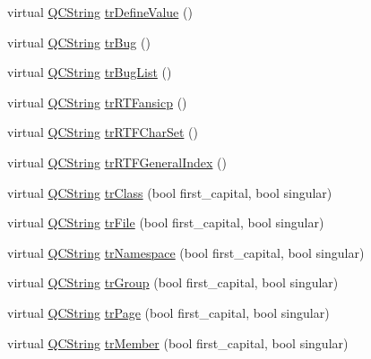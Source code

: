 \begin{DoxyCompactItemize}
\item 
virtual \mbox{\hyperlink{class_q_c_string}{Q\+C\+String}} \mbox{\hyperlink{class_translator_vietnamese_a15d8810651f40d0d83549f27adb640a2}{tr\+Define\+Value}} ()
\item 
virtual \mbox{\hyperlink{class_q_c_string}{Q\+C\+String}} \mbox{\hyperlink{class_translator_vietnamese_a22e633ef89df53443bc0d91eeb6196cb}{tr\+Bug}} ()
\item 
virtual \mbox{\hyperlink{class_q_c_string}{Q\+C\+String}} \mbox{\hyperlink{class_translator_vietnamese_ad1d04af6121febe4a12a59325064a944}{tr\+Bug\+List}} ()
\item 
virtual \mbox{\hyperlink{class_q_c_string}{Q\+C\+String}} \mbox{\hyperlink{class_translator_vietnamese_ac4cd9cfaabff4434e80e30001ae14b01}{tr\+R\+T\+Fansicp}} ()
\item 
virtual \mbox{\hyperlink{class_q_c_string}{Q\+C\+String}} \mbox{\hyperlink{class_translator_vietnamese_a52525532126029fabe558afdebd1b119}{tr\+R\+T\+F\+Char\+Set}} ()
\item 
virtual \mbox{\hyperlink{class_q_c_string}{Q\+C\+String}} \mbox{\hyperlink{class_translator_vietnamese_aedff9653f4f64f7b67e2ddf864108d54}{tr\+R\+T\+F\+General\+Index}} ()
\item 
virtual \mbox{\hyperlink{class_q_c_string}{Q\+C\+String}} \mbox{\hyperlink{class_translator_vietnamese_a007ef564d762b681b74db2eb01b661d1}{tr\+Class}} (bool first\+\_\+capital, bool singular)
\item 
virtual \mbox{\hyperlink{class_q_c_string}{Q\+C\+String}} \mbox{\hyperlink{class_translator_vietnamese_a9f90535888f432a0079053c1a1d9c39c}{tr\+File}} (bool first\+\_\+capital, bool singular)
\item 
virtual \mbox{\hyperlink{class_q_c_string}{Q\+C\+String}} \mbox{\hyperlink{class_translator_vietnamese_aa10fd8916c5d4d35a225a7202db0498b}{tr\+Namespace}} (bool first\+\_\+capital, bool singular)
\item 
virtual \mbox{\hyperlink{class_q_c_string}{Q\+C\+String}} \mbox{\hyperlink{class_translator_vietnamese_a175bf730718a663492d4a1fab71b3101}{tr\+Group}} (bool first\+\_\+capital, bool singular)
\item 
virtual \mbox{\hyperlink{class_q_c_string}{Q\+C\+String}} \mbox{\hyperlink{class_translator_vietnamese_a7215933b3fe84fc0f219d33c43dc91a1}{tr\+Page}} (bool first\+\_\+capital, bool singular)
\item 
virtual \mbox{\hyperlink{class_q_c_string}{Q\+C\+String}} \mbox{\hyperlink{class_translator_vietnamese_a86ea38ab14f2d911e804d2cf818fba36}{tr\+Member}} (bool first\+\_\+capital, bool singular)

\end{DoxyCompactItemize}
